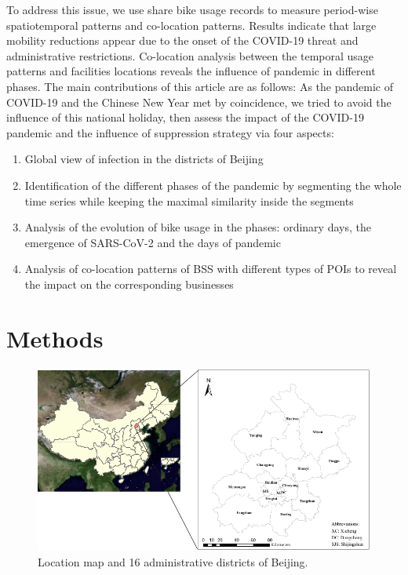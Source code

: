 \documentclass[ijgi,submit,moreauthors,pdftex]{Definitions/mdpi}
\begin{document}
To address this issue, we use share bike usage records to measure period-wise spatiotemporal patterns and co-location patterns. 
Results indicate that large mobility reductions appear due to the onset of the COVID-19 threat and administrative restrictions.
Co-location analysis between the temporal usage patterns and facilities locations reveals the influence of pandemic in different phases.
The main contributions of this article are as follows:
As the pandemic of COVID-19 and the Chinese New Year met by coincidence, we tried to avoid the influence of this national holiday, then assess the impact of the COVID-19 pandemic and the influence of suppression strategy via four aspects:
\begin{enumerate}
    \item Global view of infection in the districts of Beijing
    \item Identification of the different phases of the pandemic by segmenting the whole time series while keeping the maximal similarity inside the segments
    \item Analysis of the evolution of bike usage in the phases: ordinary days, the emergence of SARS-CoV-2 and the days of pandemic
    \item Analysis of co-location patterns of BSS with different types of POIs to reveal the impact on the corresponding businesses
\end{enumerate}


\section{Methods}

\begin{figure}[ht]
    \centering
    \includegraphics[width=\textwidth]{Figures/StudyArea.pdf}
    \caption{Location map and 16 administrative districts of Beijing.}
    \label{fig:study_area}
\end{figure}
\end{document}
